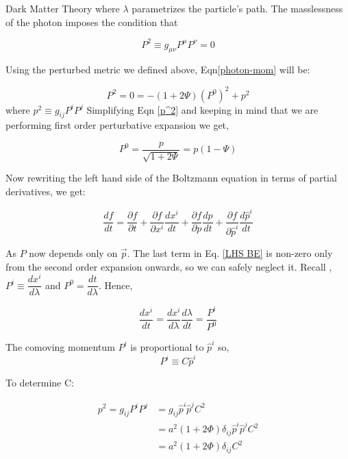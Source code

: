 \documentclass[10pt,a4paper]{book}
\begin{document}
\begin{chapter}{Dark Matter Theory}
		where $ \lambda $ parametrizes the particle's path. 
		The masslessness of the photon imposes the condition that 
		
		\begin{equation}\label{photon-mom}
		P^2 \equiv g_{\mu \nu} P^\mu P^\nu = 0
		\end{equation}
		
		Using the perturbed metric we defined above, Eqn\eqref{photon-mom} will be: 
		
		\begin{equation}\label{p^2}
		P^2 = 0 = -(1+2\Psi)(P^0)^2+ p^2 
		\end{equation}
		where $ p^2  \equiv g_{ij}P^iP^j$ 
		Simplifying Eqn \eqref{p^2} and keeping in mind that we are performing first order perturbative expansion we get,
		
		\begin{equation}\label{key}
		P^0 = \dfrac{p}{\sqrt{1+2\Psi}} = p(1-\Psi)
		\end{equation}
		
		Now rewriting the left hand side of the Boltzmann equation in terms of partial derivatives, we get:
		
		\begin{equation}\label{LHS BE}
		\dfrac{df}{dt} = \dfrac{\partial f }{\partial t} +\dfrac{\partial f }{\partial x^i}\dfrac{dx^i}{dt}+\dfrac{\partial f }{\partial p}\dfrac{dp}{dt}+\dfrac{\partial f }{\partial \hat{p}^i}\dfrac{d\hat{p}^i}{dt}  
		\end{equation}
		
		As $ P $ now depends only on $ \vec{p} $. The last term in Eq. \eqref{LHS BE} is non-zero only from the second order expansion onwards, so we can safely neglect it. Recall ,$ P^i \equiv \dfrac{dx^i}{d\lambda} $ and $ P^0 = \dfrac{dt}{d\lambda} $. Hence,
		
		\begin{equation}\label{key}
		\dfrac{dx^i}{dt} = \dfrac{dx^i}{d\lambda}\dfrac{d\lambda}{dt} = \dfrac{P^i}{P^0}		
		\end{equation}
		
		The comoving momentum $ P^i $ is proportional to $ \hat{p}^i $ so,
		\begin{equation}\label{key}
		P^i \equiv C\hat{p}^i
		\end{equation}
		
		To determine C:
		
		\begin{align}
		p^2 = g_{ij}P^i P^j &= g_{ij}\hat{p}^i \hat{p}^j C^2\\
		& = a^2(1+2 \Phi) \delta_{ij}\hat{p}^i \hat{p}^jC^2\\
		& = a^2(1+2 \Phi) \delta_{ij}C^2
		\end{align}
		

\end{chapter}
\end{document}
